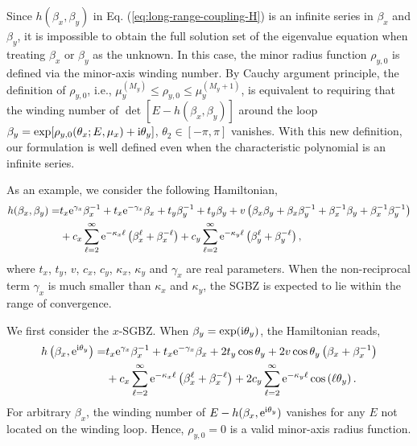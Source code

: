 Since $h(\beta_{x},\beta_{y})$ in Eq. (\ref{eq:long-range-coupling-H})
is an infinite series in $\beta_{x}$ and $\beta_{y}$, it is impossible
to obtain the full solution set of the eigenvalue equation when treating
$\beta_{x}$ or $\beta_{y}$ as the unknown. In this case, the minor
radius function $\rho_{y,0}$ is defined via the minor-axis winding
number. By Cauchy argument principle, the definition of $\rho_{y,0}$,
i.e., $\mu_{y}^{(M_{y})}\leq\rho_{y,0}\leq\mu_{y}^{(M_{y}+1)}$, is
equivalent to requiring that the winding number of $\det[E-h(\beta_{x},\beta_{y})]$
around the loop $\beta_{y}=\exp[\rho_{y,0}(\theta_{x};E,\mu_{x})+\mathrm{i}\theta_{y}]$,
$\theta_{2}\in[-\pi,\pi]$ vanishes. With this new definition, our
formulation is well defined even when the characteristic polynomial
is an infinite series.

As an example, we consider the following Hamiltonian, 
\begin{align}
h(\beta_{x},\beta_{y})= & t_{x}\mathrm{e}^{\gamma_{x}}\beta_{x}^{-1}+t_{x}\mathrm{e}^{-\gamma_{x}}\beta_{x}+t_{y}\beta_{y}^{-1}+t_{y}\beta_{y}+v\left(\beta_{x}\beta_{y}+\beta_{x}\beta_{y}^{-1}+\beta_{x}^{-1}\beta_{y}+\beta_{x}^{-1}\beta_{y}^{-1}\right)\nonumber \\
 & +c_{x}\sum_{\ell=2}^{\infty}\mathrm{e}^{-\kappa_{x}\ell}\left(\beta_{x}^{\ell}+\beta_{x}^{-\ell}\right)+c_{y}\sum_{\ell=2}^{\infty}\mathrm{e}^{-\kappa_{y}\ell}\left(\beta_{y}^{\ell}+\beta_{y}^{-\ell}\right),\label{eq:long-range-coupling-H}
\end{align}
where $t_{x}$, $t_{y}$, $v$, $c_{x}$, $c_{y}$, $\kappa_{x}$,
$\kappa_{y}$ and $\gamma_{x}$ are real parameters. When the non-reciprocal
term $\gamma_{x}$ is much smaller than $\kappa_{x}$ and $\kappa_{y}$,
the SGBZ is expected to lie within the range of convergence.

We first consider the $x$-SGBZ. When $\beta_{y}=\exp(\mathrm{i}\theta_{y})$,
the Hamiltonian reads, 
\begin{align}
h\left(\beta_{x},\mathrm{e}^{\mathrm{i}\theta_{y}}\right)= & t_{x}\mathrm{e}^{\gamma_{x}}\beta_{x}^{-1}+t_{x}\mathrm{e}^{-\gamma_{x}}\beta_{x}+2t_{y}\cos\theta_{y}+2v\cos\theta_{y}\left(\beta_{x}+\beta_{x}^{-1}\right)\nonumber \\
 & +c_{x}\sum_{\ell=2}^{\infty}\mathrm{e}^{-\kappa_{x}\ell}\left(\beta_{x}^{\ell}+\beta_{x}^{-\ell}\right)+2c_{y}\sum_{\ell=2}^{\infty}\mathrm{e}^{-\kappa_{y}\ell}\cos\left(\ell\theta_{y}\right).
\end{align}
For arbitrary $\beta_{x}$, the winding number of $E-h(\beta_{x},\mathrm{e}^{\mathrm{i}\theta_{y}})$
vanishes for any $E$ not located on the winding loop. Hence, $\rho_{y,0}=0$
is a valid minor-axis radius function.

